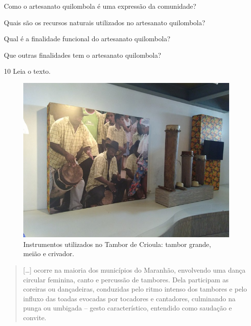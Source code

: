 \begin{escolha}
\item Como o artesanato quilombola é uma expressão da comunidade?\\

\item Quais são os recursos naturais utilizados no artesanato quilombola?\\

\item Qual é a finalidade funcional do artesanato quilombola?\\

\item Que outras finalidades tem o artesanato quilombola?\\
\end{escolha}

\num{10} Leia o texto.

\begin{figure}[htpb!]
\centering
\includegraphics[width=.8\textwidth]{./imgs/art29.png}
\caption{Instrumentos utilizados no Tambor de Crioula: tambor grande, meião e crivador.}
\end{figure}

\begin{quote}
{[}\ldots{}{]} ocorre na maioria dos municípios do
Maranhão, envolvendo uma dança circular feminina, canto e percussão de
tambores. Dela participam as coreiras ou dançadeiras, conduzidas pelo
ritmo intenso dos tambores e pelo influxo das toadas evocadas por
tocadores e cantadores, culminando na punga ou umbigada – gesto
característico, entendido como saudação e convite.

\end{quote}

